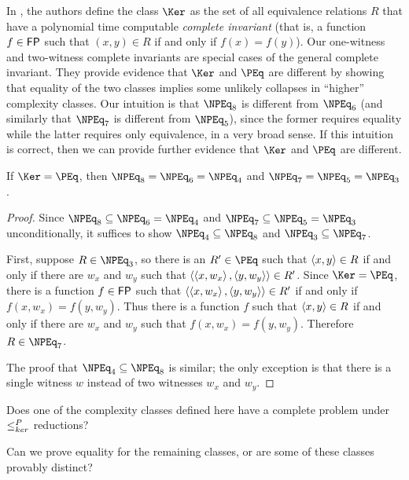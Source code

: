In \autocite{fg11}, the authors define the class $\Ker$ as the set of all equivalence relations $R$ that have a polynomial time computable \emph{complete invariant} (that is, a function $f \in {\ensuremath{\mathsf{FP}}}$ such that $(x, y) \in R$ if and only if $f(x) = f(y)$).
Our one-witness and two-witness complete invariants are special cases of the general complete invariant.
They provide evidence that $\Ker$ and $\PEq$ are different by showing that equality of the two classes implies some unlikely collapses in ``higher'' complexity classes.
Our intuition is that $\NPEq_8$ is different from $\NPEq_6$ (and similarly that $\NPEq_7$ is different from $\NPEq_5$), since the former requires equality while the latter requires only equivalence, in a very broad sense.
If this intuition is correct, then we can provide further evidence that $\Ker$ and $\PEq$ are different.

\begin{theorem}
  If $\Ker = \PEq$, then $\NPEq_8 = \NPEq_6 = \NPEq_4$ and $\NPEq_7 = \NPEq_5 = \NPEq_3$.
\end{theorem}
\begin{proof}
  Since $\NPEq_8 \subseteq \NPEq_6 = \NPEq_4$ and $\NPEq_7 \subseteq \NPEq_5 = \NPEq_3$ unconditionally, it suffices to show $\NPEq_4 \subseteq \NPEq_8$ and $\NPEq_3 \subseteq \NPEq_7$.

  First, suppose $R \in \NPEq_3$, so there is an $R' \in \PEq$ such that $\left\langle x,y\right\rangle \in R$ if and only if there are $w_x$ and $w_y$ such that $\left\langle\left\langle x,w_x\right\rangle,\left\langle y,w_y\right\rangle\right\rangle \in R'$.
  Since $\Ker = \PEq$, there is a function $f \in {\ensuremath{\mathsf{FP}}}$ such that $\left\langle\left\langle x,w_x\right\rangle,\left\langle y,w_y\right\rangle\right\rangle \in R'$ if and only if $f(x, w_x) = f(y, w_y)$.
  Thus there is a function $f$ such that $\left\langle x,y\right\rangle \in R$ if and only if there are $w_x$ and $w_y$ such that $f(x, w_x) = f(y, w_y)$.
  Therefore $R \in \NPEq_7$.

  The proof that $\NPEq_4 \subseteq \NPEq_8$ is similar; the only exception is that there is a single witness $w$ instead of two witnesses $w_x$ and $w_y$.
\end{proof}

\begin{openproblem}
  Does one of the complexity classes defined here have a complete problem under $\leq^{P}_{ker}$ reductions?
\end{openproblem}
\begin{openproblem}
  Can we prove equality for the remaining classes, or are some of these classes provably distinct?
\end{openproblem}
